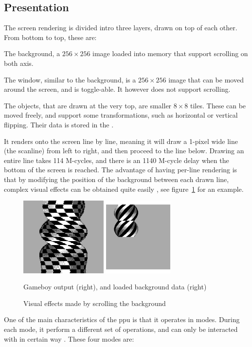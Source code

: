\documentclass[11pt]{informatics-report}
\begin{document}
\subsection{Presentation}

The screen rendering is divided intro three layers, drawn on top of each other. From bottom to top, these are:

\begin{compactitem}
	\item The background, a $256 \times 256$ image loaded into memory that support scrolling on both axis.
	\item The window, similar to the background, is a $256 \times 256$ image that can be moved around the screen, and is toggle-able. It however does not support scrolling.
	\item The objects, that are drawn at the very top, are smaller $8 \times 8$ tiles. These can be moved freely, and support some transformations, such as horizontal or vertical flipping. Their data is stored in the .
\end{compactitem}

It renders onto the screen line by line, meaning it will draw a 1-pixel wide line (the scanline) from left to right, and then proceed to the line below. Drawing an entire line takes 114 M-cycles, and there is an 1140 M-cycle delay when the bottom of the screen is reached. The advantage of having per-line rendering is that by modifying the position of the background between each drawn line, complex visual effects can be obtained quite easily \cite{gameboy_talk}, see figure~\ref{fig:background-transform} for an example.

\begin{figure}[h]
    \centering
    \includegraphics[width=8cm]{images/background-transform}\\
    \caption{Visual effects made by scrolling the background}
    Gameboy output (right), and loaded background data (right)
    \label{fig:background-transform}
\end{figure}

One of the main characteristics of the \gls{ppu} is that it operates in modes. During each mode, it perform a different set of operations, and can only be interacted with in certain way \cite[LCD Status Registers]{pandoc}. These four modes are:
\end{document}
